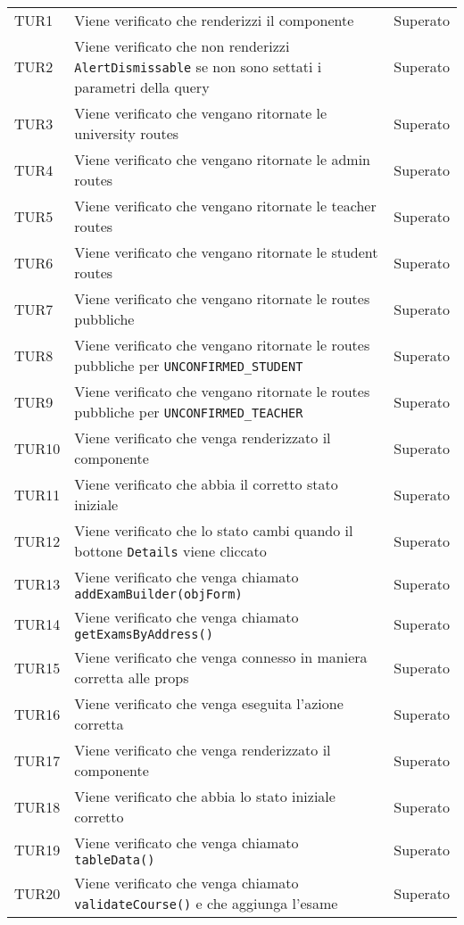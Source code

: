 \documentclass[PianoDiQualifica.tex]{subfiles}
\begin{document}
\begin{longtable}[H]{P{2cm}P{8.5cm}P{3cm}}
	\hhline{===}
	TUR1 & Viene verificato che renderizzi il componente & Superato \\ 
	TUR2 & Viene verificato che non renderizzi \texttt{AlertDismissable} se non sono settati i parametri della query & Superato \\ 
	TUR3 & Viene verificato che vengano ritornate le university routes  & Superato \\ 
	TUR4 & Viene verificato che vengano ritornate le admin routes  & Superato \\ 
	TUR5 & Viene verificato che vengano ritornate le teacher routes  & Superato \\ 
	TUR6 & Viene verificato che vengano ritornate le student routes  & Superato \\ 
	TUR7 & Viene verificato che vengano ritornate le routes pubbliche & Superato \\ 
	TUR8 & Viene verificato che vengano ritornate le routes pubbliche per \texttt{UNCONFIRMED\_STUDENT} & Superato \\ 
	TUR9 & Viene verificato che vengano ritornate le routes pubbliche per \texttt{UNCONFIRMED\_TEACHER} & Superato \\ 
	TUR10 & Viene verificato che venga renderizzato il componente & Superato \\ 
	TUR11 & Viene verificato che abbia il corretto stato iniziale & Superato \\ 
	TUR12 & Viene verificato che lo stato cambi quando il bottone \texttt{Details} viene cliccato & Superato \\ 
	TUR13 & Viene verificato che venga chiamato \texttt{addExamBuilder(objForm)} & Superato \\ 
	TUR14 & Viene verificato che venga chiamato \texttt{getExamsByAddress()} & Superato \\ 
	TUR15 & Viene verificato che venga connesso in maniera corretta alle props & Superato \\ 
	TUR16 & Viene verificato che venga eseguita l'azione corretta & Superato \\ 
	TUR17 & Viene verificato che venga renderizzato il componente & Superato \\ 
	TUR18 & Viene verificato che abbia lo stato iniziale corretto & Superato \\ 
	TUR19 & Viene verificato che venga chiamato \texttt{tableData()} & Superato \\ 
	TUR20 & Viene verificato che venga chiamato \texttt{validateCourse()} e che aggiunga l'esame & Superato \\ 

\end{longtable}
\end{document}
